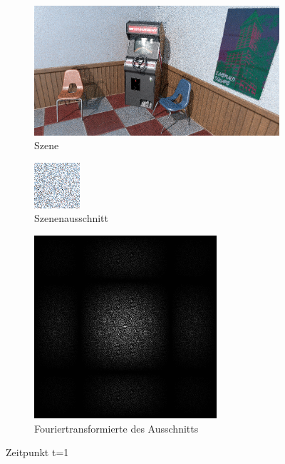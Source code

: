 \begin{figure}[H]

    \begin{subfigure}{\textwidth}
        \centering \includegraphics[scale=.25]{content/TemporalerAlg/Bilder/Sorting/Screenshots/seed_debug_3.0_selection.png}
        \caption{Szene}
        \label{fig:Nur_Sorting_Szene_t1}
    \end{subfigure}
    \begin{subfigure}{0.5\textwidth}
        \centering \includegraphics[width=0.4\linewidth]{content/TemporalerAlg/Bilder/Sorting/Screenshots/seed_debug_3.0_ausschnitt.png} 
        \caption{Szenenausschnitt}
        \label{fig:Nur_Sorting_ausschnitt_t1}
    \end{subfigure}
    \begin{subfigure}{0.5\textwidth}
        \centering \includegraphics[width=0.4\linewidth]{content/TemporalerAlg/Bilder/Sorting/Screenshots/Spektren/seed_debug_3.0_ausschnitt.png}
        \caption{Fouriertransformierte des Ausschnitts}
        \label{fig:Nur_Sorting_Fouriertransformierte_t1}
    \end{subfigure}
        \caption{Zeitpunkt t=1}
        \label{fig:Nur_Sorting_Verlauf_t1}
\end{figure}

